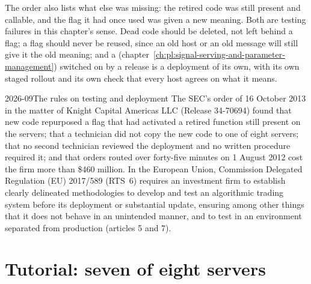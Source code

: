The order also lists what else was missing: the retired code was still present and callable, and the flag it had once used was given a new
meaning. Both are testing failures in this chapter's sense. Dead code should be deleted, not left behind a flag; a flag should never be
reused, since an old host or an old message will still give it the old meaning; and a 
(chapter~\ref{ch:pl:signal-serving-and-parameter-management}) switched on by a release is a deployment of its own, with its own staged
rollout and its own check that every host agrees on what it means.

\begin{dated}{2026-09}{The rules on testing and deployment}\label{dat:pl:testing-and-continuous-delivery:rules}
The SEC's order of 16 October 2013 in the matter of Knight Capital Americas LLC (Release 34-70694) found that new code repurposed a flag that
had activated a retired function still present on the servers; that a technician did not copy the new code to one of eight servers; that no
second technician reviewed the deployment and no written procedure required it; and that orders routed over forty-five minutes on 1 August
2012 cost the firm more than \$460 million. In the European Union, Commission Delegated Regulation (EU) 2017/589 (RTS~6) requires an
investment firm to establish clearly delineated methodologies to develop and test an algorithmic trading system before its deployment or
substantial update, ensuring among other things that it does not behave in an unintended manner, and to test in an environment separated
from production (articles 5 and 7).
\end{dated}

\section{Tutorial: seven of eight servers}\label{tut:pl:testing-and-continuous-delivery:tut}

